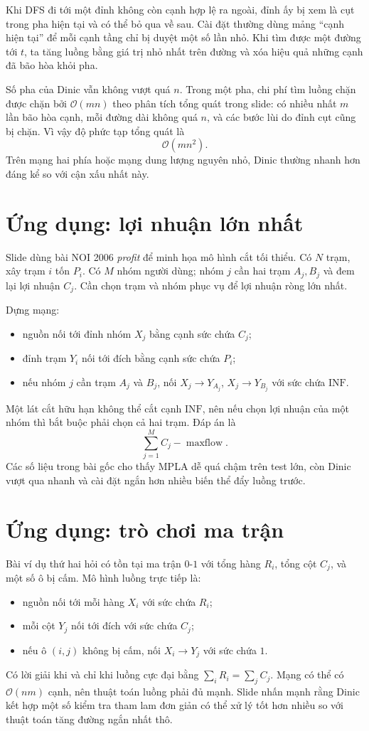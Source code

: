 \documentclass[11pt]{article}
\newcommand{\Oh}{\mathcal{O}}
\newcommand{\inftycap}{\mathrm{INF}}
\begin{document}
Khi DFS đi tới một đỉnh không còn cạnh hợp lệ ra ngoài, đỉnh ấy bị xem là
cụt trong pha hiện tại và có thể bỏ qua về sau. Cài đặt thường dùng mảng
``cạnh hiện tại'' để mỗi cạnh tầng chỉ bị duyệt một số lần nhỏ. Khi tìm được
một đường tới \(t\), ta tăng luồng bằng giá trị nhỏ nhất trên đường và xóa
hiệu quả những cạnh đã bão hòa khỏi pha.

Số pha của Dinic vẫn không vượt quá \(n\). Trong một pha, chi phí tìm luồng
chặn được chặn bởi \(\Oh(mn)\) theo phân tích tổng quát trong slide: có nhiều
nhất \(m\) lần bão hòa cạnh, mỗi đường dài không quá \(n\), và các bước lùi
do đỉnh cụt cũng bị chặn. Vì vậy độ phức tạp tổng quát là
\[
  \Oh(mn^2).
\]
Trên mạng hai phía hoặc mạng dung lượng nguyên nhỏ, Dinic thường nhanh hơn
đáng kể so với cận xấu nhất này.

\section{Ứng dụng: lợi nhuận lớn nhất}

Slide dùng bài NOI 2006 \textit{profit} để minh họa mô hình cắt tối thiểu.
Có \(N\) trạm, xây trạm \(i\) tốn \(P_i\). Có \(M\) nhóm người dùng; nhóm
\(j\) cần hai trạm \(A_j,B_j\) và đem lại lợi nhuận \(C_j\). Cần chọn trạm
và nhóm phục vụ để lợi nhuận ròng lớn nhất.

Dựng mạng:
\begin{itemize}
  \item nguồn nối tới đỉnh nhóm \(X_j\) bằng cạnh sức chứa \(C_j\);
  \item đỉnh trạm \(Y_i\) nối tới đích bằng cạnh sức chứa \(P_i\);
  \item nếu nhóm \(j\) cần trạm \(A_j\) và \(B_j\), nối
  \(X_j\to Y_{A_j}\), \(X_j\to Y_{B_j}\) với sức chứa \(\inftycap\).
\end{itemize}
Một lát cắt hữu hạn không thể cắt cạnh \(\inftycap\), nên nếu chọn lợi nhuận
của một nhóm thì bắt buộc phải chọn cả hai trạm. Đáp án là
\[
  \sum_{j=1}^{M} C_j-\operatorname{maxflow}.
\]
Các số liệu trong bài gốc cho thấy MPLA dễ quá chậm trên test lớn, còn Dinic
vượt qua nhanh và cài đặt ngắn hơn nhiều biến thể đẩy luồng trước.

\section{Ứng dụng: trò chơi ma trận}

Bài ví dụ thứ hai hỏi có tồn tại ma trận \(0\)-\(1\) với tổng hàng
\(R_i\), tổng cột \(C_j\), và một số ô bị cấm. Mô hình luồng trực tiếp là:
\begin{itemize}
  \item nguồn nối tới mỗi hàng \(X_i\) với sức chứa \(R_i\);
  \item mỗi cột \(Y_j\) nối tới đích với sức chứa \(C_j\);
  \item nếu ô \((i,j)\) không bị cấm, nối \(X_i\to Y_j\) với sức chứa \(1\).
\end{itemize}
Có lời giải khi và chỉ khi luồng cực đại bằng \(\sum_i R_i=\sum_j C_j\).
Mạng có thể có \(\Oh(nm)\) cạnh, nên thuật toán luồng phải đủ mạnh. Slide
nhấn mạnh rằng Dinic kết hợp một số kiểm tra tham lam đơn giản có thể xử lý
tốt hơn nhiều so với thuật toán tăng đường ngắn nhất thô.
\end{document}
